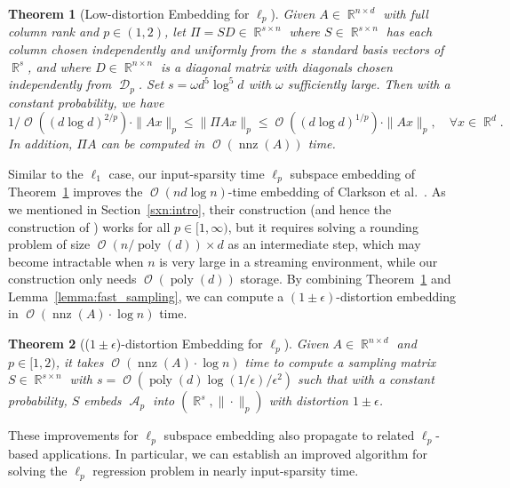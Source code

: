 \documentclass[11pt]{article}
\newtheorem{theorem}{Theorem}
\DeclareMathOperator{\poly}{poly}
\DeclareMathOperator{\bigO}{\mathcal{O}}
\DeclareMathOperator{\nnz}{nnz}
\DeclareMathOperator{\A}{\mathcal{A}}
\DeclareMathOperator{\R}{\mathbb{R}}
\DeclareMathOperator{\D}{\mathcal{D}}
\begin{document}
\begin{theorem}[Low-distortion Embedding for $\ell_p$]
  \label{thm:sparse_lp}
  Given $A \in \R^{n \times d}$ with full column rank and $p\in(1,2)$, let $\Pi
  = S D \in \R^{s \times n}$ where $S \in \R^{s \times n}$ has each column
  chosen independently and uniformly from the $s$ standard basis vectors of
  $\R^s$, and where $D \in \R^{n \times n}$ is a diagonal matrix with diagonals
  chosen independently from $\D_p$.
  Set $s = \omega d^5 \log^5 d$ with $\omega$ sufficiently large.
  Then with a constant probability, we have
  \begin{equation*}
    1/\bigO((d \log d)^{2/p}) \cdot \|A x\|_p \leq \|\Pi A x\|_p \leq 
    \bigO( (d \log d)^{1/p} ) \cdot \|A x\|_p, \quad \forall x \in \R^{d}.
  \end{equation*}
  In addition, $\Pi A$ can be computed in $\bigO(\nnz(A))$ time.
\end{theorem}


\noindent
Similar to the $\ell_1$ case, our input-sparsity time $\ell_p$ subspace
embedding of Theorem~\ref{thm:sparse_lp} improves the $\bigO(n d \log n)$-time
embedding of Clarkson et al.~\cite{CDMMMW13_SODA}.
As we mentioned in Section~\ref{sxn:intro}, their construction (and hence the
construction of \cite{CW12sparse_TR}) works for all $p \in [1, \infty)$, but it
requires solving a rounding problem of size $\bigO(n/\poly(d)) \times d$ as an
intermediate step, which may become intractable when $n$ is very large in a
streaming environment, while our construction only needs $\bigO(\poly(d))$
storage.
By combining Theorem~\ref{thm:sparse_lp} and
Lemma~\ref{lemma:fast_sampling}, we can compute a $(1\pm\epsilon)$-distortion
embedding in $\bigO(\nnz(A) \cdot \log n)$ time.

\begin{theorem}[($1\pm\epsilon$)-distortion Embedding for $\ell_p$]
  \label{thm:sparse_lp-eps}
  Given $A \in \R^{n \times d}$ and $p \in [1, 2)$, it takes $\bigO(\nnz(A)
  \cdot \log n)$ time to compute a sampling matrix $S \in \R^{s \times n}$ with
  $s = \bigO(\poly(d) \log(1/\epsilon) / \epsilon^2)$ such that with a constant
  probability, $S$ embeds $\A_p$ into $(\R^{s}, \|\cdot\|_p)$ with distortion $1
  \pm \epsilon$.
\end{theorem}

\noindent
These improvements for $\ell_p$ subspace embedding also propagate to related
$\ell_p$-based applications.
In particular, we can establish an improved algorithm for solving the $\ell_p$
regression problem in nearly input-sparsity time.
\end{document}
